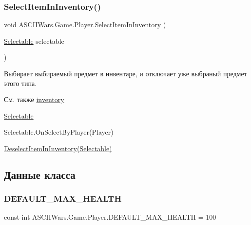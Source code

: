\subsubsection{\texorpdfstring{Select\+Item\+In\+Inventory()}{SelectItemInInventory()}}
{\footnotesize\ttfamily void A\+S\+C\+I\+I\+Wars.\+Game.\+Player.\+Select\+Item\+In\+Inventory (\begin{DoxyParamCaption}\item[{\hyperlink{class_a_s_c_i_i_wars_1_1_game_1_1_selectable}{Selectable}}]{selectable }\end{DoxyParamCaption})\hspace{0.3cm}{\ttfamily [inline]}}



Выбирает выбираемый предмет в инвентаре, и отключает уже выбраный предмет этого типа. 

\begin{DoxySeeAlso}{См. также}
\hyperlink{class_a_s_c_i_i_wars_1_1_game_1_1_player_a04acfaa196162f89bfae7aee5ec45480}{inventory} 

\hyperlink{class_a_s_c_i_i_wars_1_1_game_1_1_selectable}{Selectable} 

Selectable.\+On\+Select\+By\+Player(\+Player) 

\hyperlink{class_a_s_c_i_i_wars_1_1_game_1_1_player_a104ae32d59b6e627d55dc78ff4ffa995}{Deselect\+Item\+In\+Inventory(\+Selectable)} 
\end{DoxySeeAlso}


\subsection{Данные класса}
\hypertarget{class_a_s_c_i_i_wars_1_1_game_1_1_player_ab5921985db319187e317563c15ef48dc}{}\label{class_a_s_c_i_i_wars_1_1_game_1_1_player_ab5921985db319187e317563c15ef48dc} 
\subsubsection{\texorpdfstring{D\+E\+F\+A\+U\+L\+T\+\_\+\+M\+A\+X\+\_\+\+H\+E\+A\+L\+TH}{DEFAULT\_MAX\_HEALTH}}
{\footnotesize\ttfamily const int A\+S\+C\+I\+I\+Wars.\+Game.\+Player.\+D\+E\+F\+A\+U\+L\+T\+\_\+\+M\+A\+X\+\_\+\+H\+E\+A\+L\+TH = 100\hspace{0.3cm}{\ttfamily [private]}}



